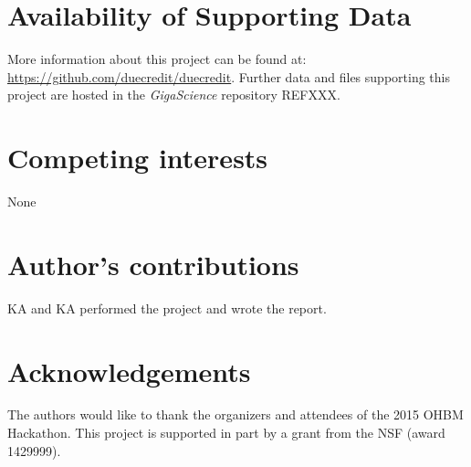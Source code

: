 \documentclass[twocolumn]{bmcart}%
\begin{document}
\begin{backmatter}

\section*{Availability of Supporting Data}
More information about this project can be found at: \url{https://github.com/duecredit/duecredit}. Further data and files supporting this project are hosted in the \emph{GigaScience} repository REFXXX.

\section*{Competing interests}
None

\section*{Author's contributions}
KA and KA performed the project and wrote the report.

\section*{Acknowledgements}
The authors would like to thank the organizers and attendees of the 2015
OHBM Hackathon. This project is supported in part by a grant from the
NSF (award 1429999).

  
  


\end{backmatter}
\end{document}
